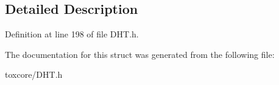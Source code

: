 \subsection{Detailed Description}


Definition at line 198 of file D\+H\+T.\+h.



The documentation for this struct was generated from the following file\+:\begin{DoxyCompactItemize}
\item 
toxcore/D\+H\+T.\+h\end{DoxyCompactItemize}
